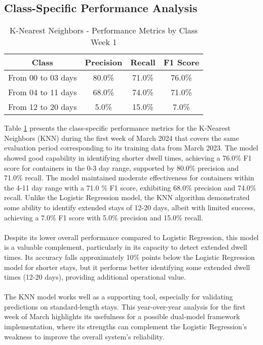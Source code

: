 		\subsection{Class-Specific Performance Analysis}
			\begin{table}[H]
				\centering
				\begin{tabular}{|c|c|c|c|}
					\hline
					\textbf{Class} & \textbf{Precision} & \textbf{Recall} & \textbf{F1 Score} \\ \hline
					From 00 to 03 days  & 80.0\%             & 71.0\%          & 76.0\%            \\ \hline
					From 04 to 11 days  & 68.0\%             & 74.0\%          & 71.0\%            \\ \hline
					From 12 to 20 days  & 5.0\%              & 15.0\%          & 7.0\%             \\ \hline
				\end{tabular}
				\caption{K-Nearest Neighbors - Performance Metrics by Class Week 1}
				\label{tab:performance_by_class_knn}
			\end{table}

			Table \ref{tab:performance_by_class_knn}
			presents the class-specific performance metrics for the K-Nearest Neighbors (KNN) during the first week of
			March 2024 that covers the same evaluation period corresponding to its training data from March 2023. The
			model
			showed good capability in identifying shorter dwell times, achieving a 76.0\%
			F1 score for containers in the 0-3 day range, supported by 80.0\% precision and 71.0\%
			recall. The model maintained moderate effectiveness for containers within the 4-11 day range with a
			71.0
			\% F1 score, exhibiting 68.0\% precision and 74.0\%
			recall. Unlike the Logistic Regression model, the KNN algorithm demonstrated some ability to identify
			extended stays of 12-20 days, albeit with limited success, achieving a 7.0\% F1 score with 5.0\%
			precision and 15.0\% recall.
			\\
			\\
			Despite its lower overall performance compared to Logistic Regression, this model is a valuable complement,
			particularly in its capacity to detect extended dwell times. Its accuracy falls approximately 10\%
			points below the Logistic Regression model for shorter stays, but it performs better identifying some
			extended dwell times (12-20 days), providing additional operational value.
			\\
			\\
			The KNN model works well as a supporting tool, especially for validating predictions on standard-length
			stays.
			This year-over-year analysis for the first week of March highlights its usefulness for a possible
			dual-model
			framework implementation, where its strengths can complement the Logistic Regression's weakness to improve
			the
			overall system's reliability.


